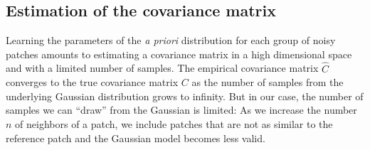 \documentclass[10pt, journal, twocolumn, final, a4paper]{IEEEtran}
\newcommand{\pcomment}[1]{}
\newcommand{\ma}[1]{\boldsymbol{#1}}
\begin{document}







\subsection{Estimation of the covariance matrix}
\label{sse:covariance-estimation}


Learning the parameters of the \emph{a priori} distribution for each group of
noisy patches amounts to estimating a covariance matrix in a high dimensional space 
and with a limited number of samples. 
%
The empirical covariance matrix $\widehat C$ converges to the true covariance matrix
$C$ as the number of samples from the underlying Gaussian distribution grows to infinity.
But in our case, the number of samples we can ``draw'' from the Gaussian is limited:
As we increase the number $n$ of neighbors of a patch, we include patches
that are not as similar to the reference patch and the Gaussian model becomes less valid. 
\end{document}
